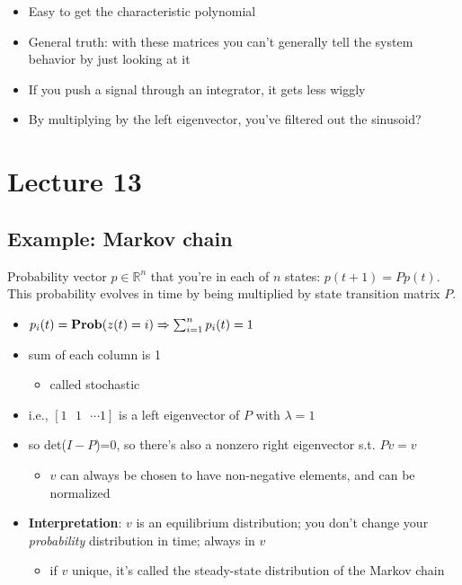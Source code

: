 \documentclass[10pt,letterpaper]{article}
\begin{document}
\begin{itemize}
\item Easy to get the characteristic polynomial
\item General truth: with these matrices you can't generally tell the system behavior by just looking at it
\item If you push a signal through an integrator, it gets less wiggly
\item By multiplying by the left eigenvector, you've filtered out the sinusoid?
\end{itemize}
\section{Lecture 13}
\label{sec-11}
\subsection{Example: Markov chain}
\label{sec-11_1}

Probability vector $p \in \mathbb{R}^{n}$ that you're in each of $n$ states: $p(t+1)=Pp(t)$. This probability evolves in time by being multiplied by state transition matrix $P$.
\begin{itemize}
\item $p _{i} (t)= {\bf Prob} (z(t)=i) \Rightarrow \sum ^{n} _{i=1} p _{i} (t) =1$
\item sum of each column is 1

\begin{itemize}
\item called stochastic
\end{itemize}

\item i.e., $[1\text{ }1\text{ } \cdots 1]$ is a left eigenvector of $P$ with $\lambda = 1$
\item so det($I-P$)=0, so there's also a nonzero right eigenvector s.t. $Pv=v$

\begin{itemize}
\item $v$ can always be chosen to have non-negative elements, and can be normalized
\end{itemize}

\item \textbf{Interpretation}: $v$ is an equilibrium distribution; you don't change your \emph{probability} distribution in time; always in $v$

\begin{itemize}
\item if $v$ unique, it's called the steady-state distribution of the Markov chain
\end{itemize}

\end{itemize}
\end{document}
